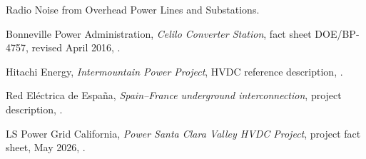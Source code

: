 \begin{enumerate}[label={[\arabic*]}, leftmargin=*, itemsep=0.4em]
{        Radio Noise from Overhead Power Lines and Substations}.
  \item Bonneville Power Administration, \emph{Celilo Converter Station},
        fact sheet DOE/BP-4757, revised April 2016, .
  \item Hitachi Energy, \emph{Intermountain Power Project}, HVDC reference
        description, .
  \item Red El\'ectrica de Espa\~na, \emph{Spain--France underground
        interconnection}, project description, .
  \item LS Power Grid California, \emph{Power Santa Clara Valley HVDC
        Project}, project fact sheet, May 2026, .
\end{enumerate}
